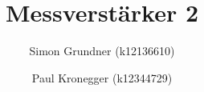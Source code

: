 \documentclass[a4paper,oneside,11pt,ngerman]{scrartcl}
\begin{document}
\title{Messverstärker 2}
\author{Simon Grundner (k12136610) \and Paul Kronegger (k12344729)}


\tableofcontents











\end{document}

